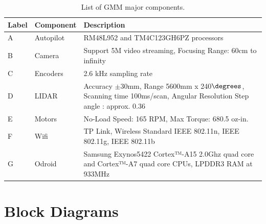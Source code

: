 \documentclass[letterpaper,12pt]{report}
\begin{document}
\begin{table}
\begin{tabular}{| l | p{3cm} | p{10cm} |}
 		\hline
 		Label & Component & Description \\ \hline 
 		A & Autopilot & RM48L952 and TM4C123GH6PZ processors\\ \hline
 		B & Camera & Support 5M video streaming, Focusing Range: 60cm to infinity\\ \hline
 		C & Encoders & 2.6 kHz sampling rate \\ \hline
 		D & LIDAR & Accuracy $\pm$30mm, Range 5600mm x 240$\degrees$, Scanning time 100ms/scan, Angular Resolution Step angle : approx. 0.36\\ \hline
 		E & Motors & No-Load Speed: 165 RPM, Max Torque: 680.5 oz-in.\\ \hline
 		F & Wifi & TP Link, Wireless Standard IEEE 802.11n, IEEE 802.11g, IEEE 802.11b\\ \hline
 		G & Odroid & Samsung Exynos5422 Cortex™-A15 2.0Ghz quad core and Cortex™-A7 quad core CPUs, LPDDR3 RAM at 933MHz \\ \hline
 
	\end{tabular}
	\caption{List of GMM major components.}
\end{table}

\chapter{Block Diagrams}
\end{document}
